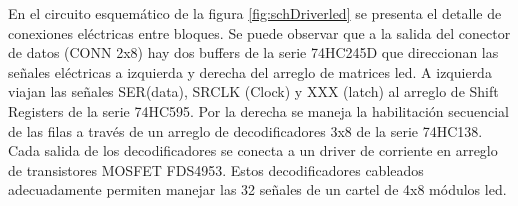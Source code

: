 En el circuito esquemático de la figura \ref{fig:schDriverled} se presenta el detalle de conexiones eléctricas entre bloques. Se puede observar que a la salida del conector de datos (CONN 2x8) hay dos buffers de la serie 74HC245D que direccionan las señales eléctricas a izquierda y derecha del arreglo de matrices led. A izquierda viajan las señales SER(data), SRCLK (Clock) y XXX (latch) al arreglo de Shift Registers de la serie 74HC595. Por la derecha se maneja la habilitación secuencial de las filas a través de un arreglo de decodificadores 3x8 de la serie 74HC138. Cada salida de los decodificadores se conecta a un driver de corriente en arreglo de transistores MOSFET FDS4953. Estos decodificadores cableados adecuadamente permiten manejar las 32 señales de un cartel de 4x8 módulos led. \\